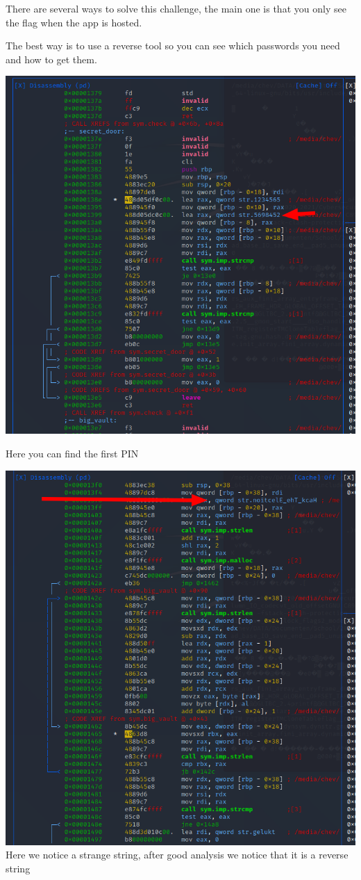 \documentclass[../main.tex]{subfiles}
\begin{document}
There are several ways to solve this challenge, the main one is that you only see the flag when the app is hosted.

The best way is to use a reverse tool so you can see which passwords you need and how to get them. 


\includegraphics[width=\linewidth]{images/Nicolai/lab_assembly_pin1.png}

Here you can find the first PIN

\includegraphics[width=\linewidth]{images/Nicolai/lab_assembly_pin2.png}
Here we notice a strange string, after good analysis we notice that it is a reverse string
\end{document}
